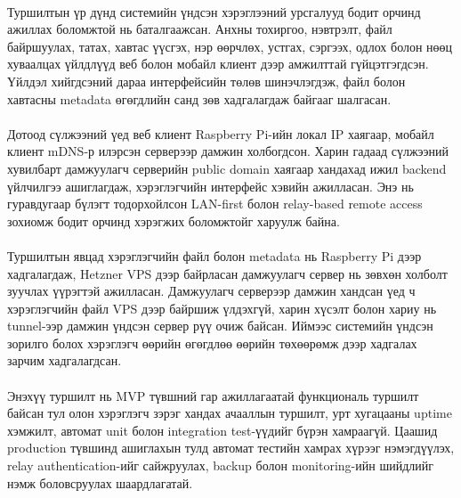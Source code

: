 \paragraph{}
Туршилтын үр дүнд системийн үндсэн хэрэглээний урсгалууд бодит орчинд ажиллах боломжтой нь баталгаажсан. Анхны тохиргоо, нэвтрэлт, файл байршуулах, татах, хавтас үүсгэх, нэр өөрчлөх, устгах, сэргээх, одлох болон нөөц хуваалцах үйлдлүүд веб болон мобайл клиент дээр амжилттай гүйцэтгэгдсэн. Үйлдэл хийгдсэний дараа интерфейсийн төлөв шинэчлэгдэж, файл болон хавтасны metadata өгөгдлийн санд зөв хадгалагдаж байгааг шалгасан.

\paragraph{}
Дотоод сүлжээний үед веб клиент Raspberry Pi-ийн локал IP хаягаар, мобайл клиент mDNS-р илэрсэн серверээр дамжин холбогдсон. Харин гадаад сүлжээний хувилбарт дамжуулагч серверийн public domain хаягаар хандахад ижил backend үйлчилгээ ашиглагдаж, хэрэглэгчийн интерфейс хэвийн ажилласан. Энэ нь гуравдугаар бүлэгт тодорхойлсон LAN-first болон relay-based remote access зохиомж бодит орчинд хэрэгжих боломжтойг харуулж байна.

\paragraph{}
Туршилтын явцад хэрэглэгчийн файл болон metadata нь Raspberry Pi дээр хадгалагдаж, Hetzner VPS дээр байрласан дамжуулагч сервер нь зөвхөн холболт зуучлах үүрэгтэй ажилласан. Дамжуулагч серверээр дамжин хандсан үед ч хэрэглэгчийн файл VPS дээр байршиж үлдэхгүй, харин хүсэлт болон хариу нь tunnel-ээр дамжин үндсэн сервер рүү очиж байсан. Иймээс системийн үндсэн зорилго болох хэрэглэгч өөрийн өгөгдлөө өөрийн төхөөрөмж дээр хадгалах зарчим хадгалагдсан.

\paragraph{}
Энэхүү туршилт нь MVP түвшний гар ажиллагаатай функциональ туршилт байсан тул олон хэрэглэгч зэрэг хандах ачааллын туршилт, урт хугацааны uptime хэмжилт, автомат unit болон integration test-үүдийг бүрэн хамраагүй. Цаашид production түвшинд ашиглахын тулд автомат тестийн хамрах хүрээг нэмэгдүүлэх, relay authentication-ийг сайжруулах, backup болон monitoring-ийн шийдлийг нэмж боловсруулах шаардлагатай.

